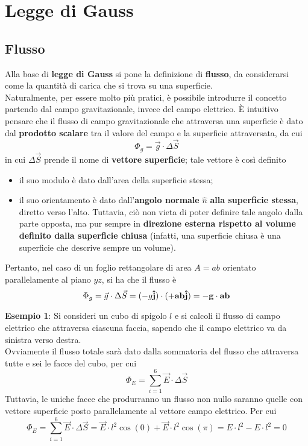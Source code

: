 \documentclass[a4paper]{extarticle}
\begin{document}
\section{Legge di Gauss}


\vspace{1em}
\subsection{Flusso}
Alla base di \textbf{legge di Gauss} si pone la definizione di \textbf{flusso}, da considerarsi come la quantità di carica che si trova su una superficie.\\
Naturalmente, per essere molto più pratici, è possibile introdurre il concetto partendo dal campo gravitazionale, invece del campo elettrico. È intuitivo pensare che il flusso di campo gravitazionale che attraversa una superficie è dato dal \textbf{prodotto scalare} tra il valore del campo e la superficie attraversata, da cui
\[\boxed{\Phi_g = \vec g \cdot \Delta \vec S}\]
in cui $\Delta \vec S$ prende il nome di \textbf{vettore superficie}; tale vettore è così definito
\begin{itemize}
  \item il suo modulo è dato dall'area della superficie stessa;
  \item il suo orientamento è dato dall'\textbf{angolo normale} $\hat{n}$ \textbf{alla superficie stessa}, diretto verso l'alto. Tuttavia, ciò non vieta di poter definire tale angolo dalla parte opposta, ma pur sempre in \textbf{direzione esterna rispetto al volume definito dalla superficie chiusa} (infatti, una superficie chiusa è una superficie che descrive sempre un volume).
\end{itemize}
Pertanto, nel caso di un foglio rettangolare di area $A = ab$ orientato parallelamente al piano $yz$, si ha che il flusso è
\[\Phi_g = \vec g \cdot \Delta \vec S = (-g \bf{\hat j}) \cdot (+ab \bf{\hat j}) = -g \cdot ab\]

\vspace{1em}
\noindent
\textbf{Esempio 1}: Si consideri un cubo di spigolo $l$ e si calcoli il flusso di campo elettrico che attraversa ciascuna faccia, sapendo che il campo elettrico va da sinistra verso destra.\\
Ovviamente il flusso totale sarà dato dalla sommatoria del flusso che attraversa tutte e sei le facce del cubo, per cui
\[\Phi_E = \sum_{i=1}^6 \vec E \cdot \Delta \vec S\]
Tuttavia, le uniche facce che produrranno un flusso non nullo saranno quelle con vettore superficie posto parallelamente al vettore campo elettrico. Per cui
\[\Phi_E = \sum_{i=1}^6 \vec E \cdot \Delta \vec S = \vec E \cdot l^2 \cos \left(0\right) + \vec E \cdot l^2 \cos \left(\pi\right) = E \cdot l^2 - E \cdot l^2 = 0\]
\end{document}
